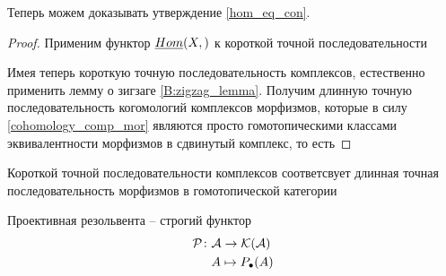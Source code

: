 \documentclass[../main.tex]{subfiles}
\begin{document}
Теперь можем доказывать утверждение \ref{hom_eq_con}.
\begin{proof}
Применим функтор $\underline{Hom}(X,)$ к короткой точной последовательности
\bee\label{3:cone_short_exact_eq}
\eee
\bee
\eee
Имея теперь короткую точную последовательность комплексов, естественно применить лемму о зигзаге \ref{B:zigzag_lemma}. Получим длинную точную последовательность когомологий комплексов морфизмов, которые в силу \ref{cohomology_comp_mor} являются просто гомотопическими классами эквивалентности морфизмов в сдвинутый комплекс, то есть
\bee
{}
\eee
\end{proof}
\begin{to_lem}
    Короткой точной последовательности комплексов соответсвует длинная точная последовательность морфизмов в гомотопической категории
    \bee
{}
    \eee
\bee
{}
    \eee
\end{to_lem}
\begin{to_suj}\label{tactics}
    Проективная резольвента -- строгий функтор
    \begin{align*}
        \mathcal{P}\colon&\mathcal{A} \to\mathcal{K(A)}\\
         &A \mapsto P_\bullet(A)
    \end{align*}
\end{to_suj}
\end{document}
